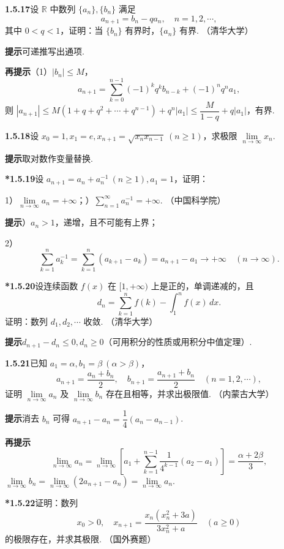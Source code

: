 \documentclass[UTF8,12pt,a4paper,fontset=fandol]{ctexart}
\begin{document}
\noindent\textbf{1.5.17}\quad 设 $\mathbb{R}$ 中数列 $\{a_n\},\{b_n\}$ 满足
\[
  a_{n+1}=b_n-qa_n,\quad n=1,2,\cdots,
\]
其中 $0<q<1$，证明：当 $\{b_n\}$ 有界时，$\{a_n\}$ 有界. （清华大学）

\noindent\textbf{提示}\quad 可递推写出通项.

\noindent\textbf{再提示}\quad （1）$|b_n|\le M$，
\[
  a_{n+1}=\sum_{k=0}^{n-1}(-1)^kq^kb_{n-k}+(-1)^nq^na_1,
\]
则 $|a_{n+1}|\le M(1+q+q^2+\cdots+q^{n-1})+q^n|a_1|\le \dfrac{M}{1-q}+q|a_1|$，有界.

\noindent\textbf{1.5.18}\quad 设 $x_0=1,x_1=e,x_{n+1}=\sqrt{x_nx_{n-1}}\ (n\ge 1)$，求极限 $\lim\limits_{n\to\infty}x_n$.

\noindent\textbf{提示}\quad 取对数作变量替换.

\noindent\textbf{*1.5.19}\quad 设 $a_{n+1}=a_n+a_n^{-1}\ (n\ge 1),a_1=1$，证明：

1）$\lim\limits_{n\to\infty}a_n=+\infty$；）$\sum\limits_{n=1}^{\infty}a_n^{-1}=+\infty$. （中国科学院）

\noindent\textbf{提示}）$a_n>1$，递增，且不可能有上界；

2）
\[
  \sum_{k=1}^n a_k^{-1}=\sum_{k=1}^n(a_{k+1}-a_k)=a_{n+1}-a_1\to +\infty\quad (n\to\infty).
\]

\noindent\textbf{*1.5.20}\quad 设连续函数 $f(x)$ 在 $[1,+\infty)$ 上是正的，单调递减的，且
\[
  d_n=\sum_{k=1}^n f(k)-\int_1^n f(x)\,dx.
\]
证明：数列 $d_1,d_2,\cdots$ 收敛. （清华大学）

\noindent\textbf{提示}\quad $d_{n+1}-d_n\le 0,d_n\ge 0$（可用积分的性质或用积分中值定理）.

\noindent\textbf{1.5.21}\quad 已知 $a_1=\alpha,b_1=\beta\ (\alpha>\beta)$，
\[
  a_{n+1}=\frac{a_n+b_n}{2},\quad
  b_{n+1}=\frac{a_{n+1}+b_n}{2}\quad (n=1,2,\cdots),
\]
证明 $\lim\limits_{n\to\infty}a_n$ 及 $\lim\limits_{n\to\infty}b_n$ 存在且相等，并求出极限值. （内蒙古大学）

\noindent\textbf{提示}\quad 消去 $b_n$ 可得 $a_{n+1}-a_n=\dfrac14(a_n-a_{n-1})$.

\noindent\textbf{再提示}\quad
\[
  \lim_{n\to\infty}a_n=\lim_{n\to\infty}\left[a_1+\sum_{k=1}^{n-1}\frac1{4^{k-1}}(a_2-a_1)\right]=\frac{\alpha+2\beta}{3},
\]
$\lim\limits_{n\to\infty}b_n=\lim\limits_{n\to\infty}(2a_{n+1}-a_n)=\lim\limits_{n\to\infty}a_n$.

\noindent\textbf{*1.5.22}\quad 证明：数列
\[
  x_0>0,\quad x_{n+1}=\frac{x_n(x_n^2+3a)}{3x_n^2+a}\quad (a\ge 0)
\]
的极限存在，并求其极限. （国外赛题）
\end{document}
